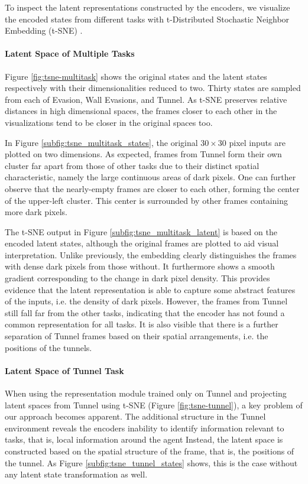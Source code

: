 To inspect the latent representations constructed by the encoders, we visualize the encoded states from different tasks with t-Distributed Stochastic Neighbor Embedding (t-SNE) \citep{tsne}. 

\paragraph{Latent Space of Multiple Tasks}
Figure \ref{fig:tsne-multitask} shows the original states and the latent states respectively with their dimensionalities reduced to two. Thirty states are sampled from each of Evasion, Wall Evasions, and Tunnel. 
As t-SNE preserves relative distances in high dimensional spaces, the frames closer to each other in the visualizations tend to be closer in the original spaces too.

In Figure \ref{subfig:tsne_multitask_states}, the original $30\times30$ pixel inputs are plotted on two dimensions.
As expected, frames from Tunnel form their own cluster far apart from those of other tasks due to their distinct spatial characteristic, namely the large continuous areas of dark pixels. One can further observe that the nearly-empty frames are closer to each other, forming the center of the upper-left cluster. This center is surrounded by other frames containing more dark pixels.

The t-SNE output in Figure \ref{subfig:tsne_multitask_latent} is based on the encoded latent states, although the original frames are plotted to aid visual interpretation.
Unlike previously, the embedding clearly distinguishes the frames with dense dark pixels from those without. It furthermore shows a smooth gradient corresponding to the change in dark pixel density.
This provides evidence that the latent representation is able to capture some abstract features of the inputs, i.e. the density of dark pixels.
However, the frames from Tunnel still fall far from the other tasks, indicating that the encoder has not found a common representation for all tasks.
It is also visible that there is a further separation of Tunnel frames based on their spatial arrangements, i.e. the positions of the tunnels.

\paragraph{Latent Space of Tunnel Task} \label{para:latent_tunnel}
When using the representation module trained only on Tunnel and projecting latent spaces from Tunnel using t-SNE (Figure \ref{fig:tsne-tunnel}), a key problem of our approach becomes apparent. 
The additional structure in the Tunnel environment reveals the encoders inability to identify information relevant to tasks, that is, local information around the agent 
Instead, the latent space is constructed based on the spatial structure of the frame, that is, the positions of the tunnel.
As Figure \ref{subfig:tsne_tunnel_states} shows, this is the case without any latent state transformation as well. 

